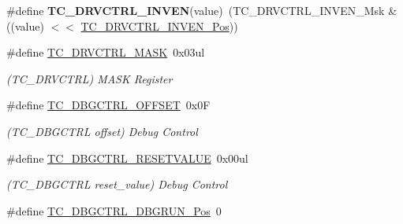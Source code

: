 \begin{DoxyCompactItemize}
\item 
\hypertarget{group___s_a_m_l21___t_c_gafa4da6b0971912ca04fe780a1e179089}{}\#define {\bfseries T\+C\+\_\+\+D\+R\+V\+C\+T\+R\+L\+\_\+\+I\+N\+V\+E\+N}(value)~(T\+C\+\_\+\+D\+R\+V\+C\+T\+R\+L\+\_\+\+I\+N\+V\+E\+N\+\_\+\+Msk \& ((value) $<$$<$ \hyperlink{group___s_a_m_l21___t_c_ga811926c25d3d94961c74d2276bc953b1}{T\+C\+\_\+\+D\+R\+V\+C\+T\+R\+L\+\_\+\+I\+N\+V\+E\+N\+\_\+\+Pos}))\label{group___s_a_m_l21___t_c_gafa4da6b0971912ca04fe780a1e179089}

\item 
\hypertarget{group___s_a_m_l21___t_c_ga29e5494d92eb91592a8ff282d61be2d1}{}\#define \hyperlink{group___s_a_m_l21___t_c_ga29e5494d92eb91592a8ff282d61be2d1}{T\+C\+\_\+\+D\+R\+V\+C\+T\+R\+L\+\_\+\+M\+A\+S\+K}~0x03ul\label{group___s_a_m_l21___t_c_ga29e5494d92eb91592a8ff282d61be2d1}

\begin{DoxyCompactList}\small\item\em (T\+C\+\_\+\+D\+R\+V\+C\+T\+R\+L) M\+A\+S\+K Register \end{DoxyCompactList}\item 
\hypertarget{group___s_a_m_l21___t_c_ga2519e4270cc362a5fb2afddb488077ad}{}\#define \hyperlink{group___s_a_m_l21___t_c_ga2519e4270cc362a5fb2afddb488077ad}{T\+C\+\_\+\+D\+B\+G\+C\+T\+R\+L\+\_\+\+O\+F\+F\+S\+E\+T}~0x0\+F\label{group___s_a_m_l21___t_c_ga2519e4270cc362a5fb2afddb488077ad}

\begin{DoxyCompactList}\small\item\em (T\+C\+\_\+\+D\+B\+G\+C\+T\+R\+L offset) Debug Control \end{DoxyCompactList}\item 
\hypertarget{group___s_a_m_l21___t_c_ga0aebb90c97a63ac996a5221ee58ec320}{}\#define \hyperlink{group___s_a_m_l21___t_c_ga0aebb90c97a63ac996a5221ee58ec320}{T\+C\+\_\+\+D\+B\+G\+C\+T\+R\+L\+\_\+\+R\+E\+S\+E\+T\+V\+A\+L\+U\+E}~0x00ul\label{group___s_a_m_l21___t_c_ga0aebb90c97a63ac996a5221ee58ec320}

\begin{DoxyCompactList}\small\item\em (T\+C\+\_\+\+D\+B\+G\+C\+T\+R\+L reset\+\_\+value) Debug Control \end{DoxyCompactList}\item 
\hypertarget{group___s_a_m_l21___t_c_gaaf3fdc9dbb422f406b9238a4ee2100a6}{}\#define \hyperlink{group___s_a_m_l21___t_c_gaaf3fdc9dbb422f406b9238a4ee2100a6}{T\+C\+\_\+\+D\+B\+G\+C\+T\+R\+L\+\_\+\+D\+B\+G\+R\+U\+N\+\_\+\+Pos}~0\label{group___s_a_m_l21___t_c_gaaf3fdc9dbb422f406b9238a4ee2100a6}


\end{DoxyCompactItemize}
